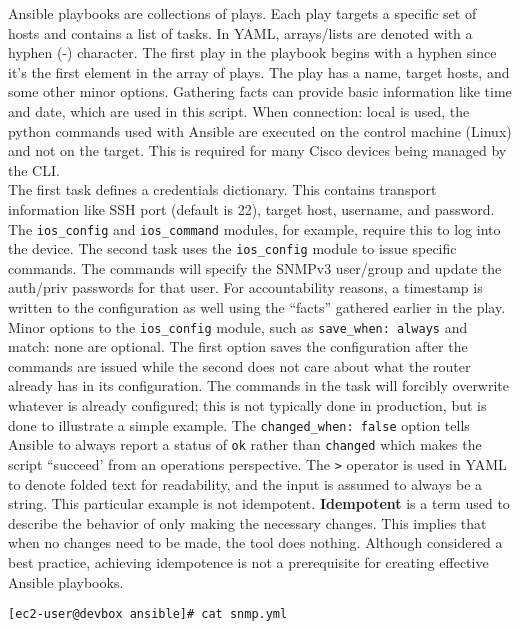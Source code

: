Ansible playbooks are collections of plays. Each play targets a specific set
of hosts and contains a list of tasks. In YAML, arrays/lists are denoted with
a hyphen (-) character. The first play in the playbook begins with a hyphen
since it’s the first element in the array of plays. The play has a name,
target hosts, and some other minor options. Gathering facts can provide basic
information like time and date, which are used in this script. When
connection: local is used, the python commands used with Ansible are executed
on the control machine (Linux) and not on the target. This is required for
many Cisco devices being managed by the CLI. \\

The first task defines a credentials dictionary. This contains transport
information like SSH port (default is 22), target host, username, and
password. The \verb|ios_config| and \verb|ios_command| modules, for example,
require this to log into the device. The second task uses the
\verb|ios_config| module to issue specific commands. The commands will specify
the SNMPv3 user/group and update the auth/priv passwords for that user. For
accountability reasons, a timestamp is written to the configuration as well
using the ``facts'' gathered earlier in the play. Minor options to the
\verb|ios_config| module, such as \verb|save_when: always| and match: none are
optional. The first option saves the configuration after the commands are
issued while the second does not care about what the router already has in its
configuration. The commands in the task will forcibly overwrite whatever is
already configured; this is not typically done in production, but is done to
illustrate a simple example. The \verb|changed_when: false| option tells
Ansible to always report a status of \verb|ok| rather than \verb|changed|
which makes the script ``succeed' from an operations perspective. The \verb|>|
operator is used in YAML to denote folded text for readability, and the input
is assumed to always be a string. This particular example is not idempotent.
\textbf{Idempotent} is a term used to describe the behavior of only making the
necessary changes. This implies that when no changes need to be made, the tool
does nothing. Although considered a best practice, achieving idempotence is
not a prerequisite for creating effective Ansible playbooks.

\begin{verbatim}
[ec2-user@devbox ansible]# cat snmp.yml 
\end{verbatim}

